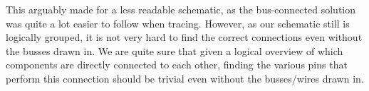This arguably made for a less readable schematic, as the bus-connected solution
was quite a lot easier to follow when tracing. However, as our schematic still
is logically grouped, it is not very hard to find the correct connections even
without the busses drawn in. We are quite sure that given a logical overview of
which components are directly connected to each other, finding the various pins
that perform this connection should be trivial even without the busses/wires
drawn in.


